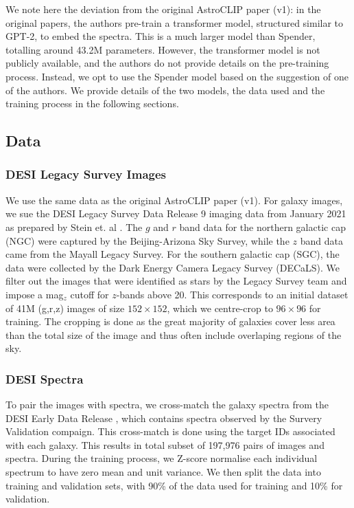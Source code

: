 \documentclass[a4paper,12pt]{article}
\begin{document}
We note here the deviation from the original AstroCLIP paper (v1): in the original papers, the authors pre-train a transformer model, structured similar to GPT-2, to embed the spectra. This is a much larger model than Spender, totalling around 43.2M parameters. However, the transformer model is not publicly available, and the authors do not provide details on the pre-training process. Instead, we opt to use the Spender model based on the suggestion of one of the authors. We provide details of 
the two models, the data used and the training process in the following sections.



\subsection{Data}
\label{sec:data}
\subsubsection*{DESI Legacy Survey Images}
We use the same data as the original AstroCLIP paper (v1). For galaxy images, we sue the DESI Legacy Survey Data Release 9 imaging data from January 2021 \cite{DESI} as prepared by Stein et. al \cite{stein}. The $g$ and $r$ band data for the northern galactic cap (NGC) were captured by the Beijing-Arizona Sky Survey, while the $z$ band data came from the Mayall Legacy Survey. For the southern galactic cap (SGC), the data were collected by the Dark Energy Camera Legacy Survey (DECaLS). We filter out the images that were identified as stars by the Legacy Survey team and impose a mag$_z$ cutoff for $z$-bands above 20. This corresponds to an initial dataset of 41M (g,r,z) images of size $152 \times 152$, which we centre-crop to $96 \times 96$ for training. The cropping is done as the great majority of galaxies cover less area than the total size of the image and thus often include overlaping regions of the sky.

\subsubsection*{DESI Spectra}
To pair the images with spectra, we cross-match the galaxy spectra from the DESI Early Data Release \cite{DESI2023}, which contains spectra observed by the Survery Validation compaign. This cross-match is done using the target IDs associated with each galaxy. This results in total subset of 197,976 pairs of images and spectra. During the training process, we Z-score normalise each individual spectrum to have zero mean and unit variance. We then split the data into training and validation sets, with 90\% of the data used for training and 10\% for validation.
\end{document}
